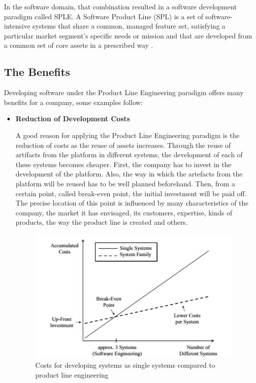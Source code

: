 In the software domain, that combination resulted in a software development
paradigm called \acf{SPLE}. A Software
Product Line (\ac{SPL}) is a set of software-intensive systems that share a common, managed feature set, satisfying a particular market 
segment’s speciﬁc needs or mission and that are developed from a common set of core assets in a 
prescribed way \citep{clements2002software}.

\subsection{The Benefits}
Developing software under the Product Line Engineering paradigm offers many benefits for a company, 
some examples follow:
\begin{itemize}
\item \textbf{Reduction of Development Costs}

A good reason for applying the Product Line Engineering paradigm is the reduction of costs as the reuse 
of assets increases. Through the reuse of artifacts from the platform in different systems, the development 
of each of these systems becomes cheaper. First, the company has to invest in the development of the platform. 
Also, the way in which the artefacts from the platform will be reused has to be well planned beforehand. Then, 
from a certain point, called break-even point, the initial investment will be paid off. The precise location of 
this point is influenced by many characteristics of the company, the market it has envisaged, its customers, 
expertise, kinds of products, the way the product line is created and others. 

\begin{figure}[htp]
\begin{center}
  \includegraphics[width=11cm]{chapters/background/img/splcosts.png}
  \caption[Costs for developing systems as single systems compared to product 
  line engineering]{Costs for developing systems as single systems compared to product line engineering \citep{Pohl2005}}
  \label{fg:spl-costs}
\end{center}
\end{figure}


\end{itemize}
